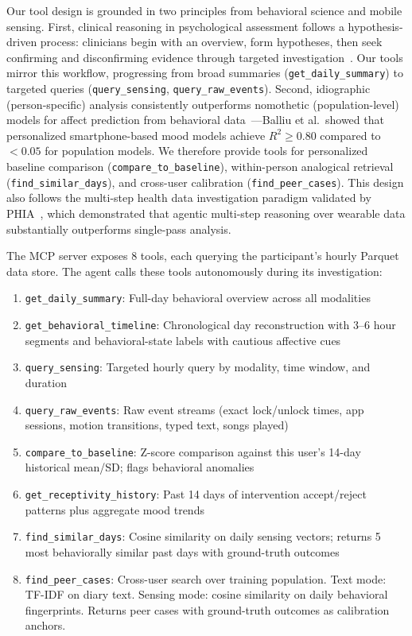 \documentclass[screen,review,anonymous]{acmart}
\begin{document}
Our tool design is grounded in two principles from behavioral science and mobile sensing. First, clinical reasoning in psychological assessment follows a hypothesis-driven process: clinicians begin with an overview, form hypotheses, then seek confirming and disconfirming evidence through targeted investigation~\cite{wilcox2023clinical_reasoning}. Our tools mirror this workflow, progressing from broad summaries (\texttt{get\_daily\_summary}) to targeted queries (\texttt{query\_sensing}, \texttt{query\_raw\_events}). Second, idiographic (person-specific) analysis consistently outperforms nomothetic (population-level) models for affect prediction from behavioral data~\cite{beltz2016idiographic, balliu2024personalized_mood}---Balliu et al.\ showed that personalized smartphone-based mood models achieve $R^2 \geq 0.80$ compared to $< 0.05$ for population models. We therefore provide tools for personalized baseline comparison (\texttt{compare\_to\_baseline}), within-person analogical retrieval (\texttt{find\_similar\_days}), and cross-user calibration (\texttt{find\_peer\_cases}). This design also follows the multi-step health data investigation paradigm validated by PHIA~\cite{merrill2025phia}, which demonstrated that agentic multi-step reasoning over wearable data substantially outperforms single-pass analysis.

The MCP server exposes 8 tools, each querying the participant's hourly Parquet data store. The agent calls these tools autonomously during its investigation:

\begin{enumerate}[nosep]
    \item \texttt{get\_daily\_summary}: Full-day behavioral overview across all modalities
    \item \texttt{get\_behavioral\_timeline}: Chronological day reconstruction with 3--6 hour segments and behavioral-state labels with cautious affective cues
    \item \texttt{query\_sensing}: Targeted hourly query by modality, time window, and duration
    \item \texttt{query\_raw\_events}: Raw event streams (exact lock/unlock times, app sessions, motion transitions, typed text, songs played)
    \item \texttt{compare\_to\_baseline}: Z-score comparison against this user's 14-day historical mean/SD; flags behavioral anomalies
    \item \texttt{get\_receptivity\_history}: Past 14 days of intervention accept/reject patterns plus aggregate mood trends
    \item \texttt{find\_similar\_days}: Cosine similarity on daily sensing vectors; returns 5 most behaviorally similar past days with ground-truth outcomes
    \item \texttt{find\_peer\_cases}: Cross-user search over training population. Text mode: TF-IDF on diary text. Sensing mode: cosine similarity on daily behavioral fingerprints. Returns peer cases with ground-truth outcomes as calibration anchors.
\end{enumerate}
\end{document}
